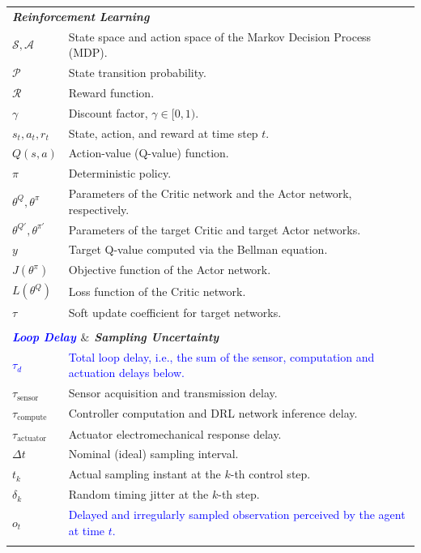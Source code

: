 \documentclass[review]{elsarticle}
\begin{document}
\begin{longtable}{@{}p{2.5cm} p{12.5cm}@{}}
\multicolumn{2}{l}{\textbf{\textit{Reinforcement Learning}}} \\
$\mathcal{S}, \mathcal{A}$ & State space and action space of the Markov Decision Process (MDP). \\
$\mathcal{P}$ & State transition probability. \\
$\mathcal{R}$ & Reward function. \\
$\gamma$ & Discount factor, $\gamma \in [0,1)$. \\
$s_t, a_t, r_t$ & State, action, and reward at time step $t$. \\
$Q(s,a)$ & Action-value (Q-value) function. \\
$\pi$ & Deterministic policy. \\
$\theta^Q, \theta^\pi$ & Parameters of the Critic network and the Actor network, respectively. \\
$\theta^{Q'}, \theta^{\pi'}$ & Parameters of the target Critic and target Actor networks. \\
$y$ & Target Q-value computed via the Bellman equation. \\
$J(\theta^\pi)$ & Objective function of the Actor network. \\
$L(\theta^Q)$ & Loss function of the Critic network. \\
$\tau$ & Soft update coefficient for target networks. \\
\\

\multicolumn{2}{l}{\textbf{\textit{\textcolor{blue}{Loop Delay} $\&$ Sampling Uncertainty}}} \\
\textcolor{blue}{$\tau_{d}$} & \textcolor{blue}{Total loop delay, i.e., the sum of the sensor, computation and actuation delays below.} \\
$\tau_{\mathrm{sensor}}$ & Sensor acquisition and transmission delay. \\
$\tau_{\mathrm{compute}}$ & Controller computation and DRL network inference delay. \\
$\tau_{\mathrm{actuator}}$ & Actuator electromechanical response delay. \\
$\Delta t$ & Nominal (ideal) sampling interval. \\
$t_k$ & Actual sampling instant at the $k$-th control step. \\
$\delta_k$ & Random timing jitter at the $k$-th step. \\
$o_t$ & \textcolor{blue}{Delayed and irregularly sampled observation perceived by the agent at time $t$.} \\
\\


\end{longtable}
\end{document}
